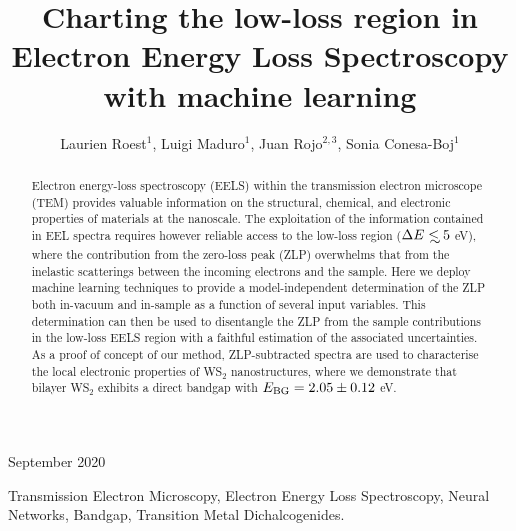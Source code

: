 \documentclass[12pt]{iopart}
\def\lsim{\mathrel{\rlap{\lower4pt\hbox{\hskip1pt$\sim$}}
    \raise1pt\hbox{$<$}}}
\begin{document}

\title[Charting Electron Energy Loss Spectroscopy with machine learning]{Charting the low-loss region in Electron Energy Loss Spectroscopy with machine learning}

\author{Laurien Roest$^{1}$,
  Luigi Maduro$^{1}$,
  Juan Rojo$^{2,3}$, Sonia Conesa-Boj$^{1}$}
\address{$^{1}$Kavli Institute of Nanoscience, Delft University of Technology, 2628CJ Delft, The
  Netherlands\\
$^{2}$Nikhef Theory Group, Science Park 105, 1098 XG Amsterdam, The
  Netherlands \\$^{3}$Department of Physics and Astronomy, VUA,
  1081 HV Amsterdam, The Netherlands}

\vspace{10pt}
\begin{indented}
\item[]September 2020
\end{indented}



\begin{abstract}
  Electron energy-loss spectroscopy (EELS) within the
  transmission electron microscope (TEM) provides valuable information on the structural, chemical, and electronic properties of materials at the nanoscale.
%
%
The exploitation of the information contained in EEL spectra requires
however reliable
access to the
low-loss region ($\Delta E\lsim 5$ eV),
where the contribution from the zero-loss peak (ZLP) overwhelms
that from
the inelastic scatterings between the incoming electrons and the sample.
%
Here we deploy machine learning techniques
to provide a model-independent determination of the ZLP
both in-vacuum and in-sample as a function of several input variables.
%
This determination can then be used to disentangle
the ZLP from the sample contributions in the low-loss EELS
region
with a faithful estimation of the associated uncertainties.
%
As a proof of concept of our  method, ZLP-subtracted
spectra are used to characterise the local electronic properties of
WS$_2$ nanostructures, where we demonstrate that bilayer WS$_2$ exhibits a direct bandgap
with $E_{\rm BG}= 2.05 \pm 0.12$ eV.
\end{abstract}

 {\small Transmission Electron Microscopy,
Electron Energy Loss Spectroscopy, Neural Networks, Bandgap, Transition
Metal Dichalcogenides.}\\
\end{document}
